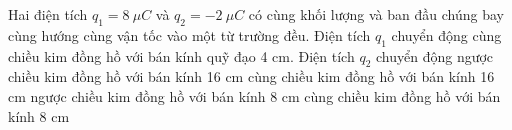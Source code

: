 \begin{vidu} %
	Hai điện tích $q_1 = 8\ \mu C$ và $q_2 = -2\ \mu C$ có cùng khối lượng và ban đầu chúng bay cùng hướng cùng vận tốc vào một từ trường đều. Điện tích ${q_1}$ chuyển động cùng chiều kim đồng hồ với bán kính quỹ đạo 4 cm. Điện tích ${q_2}$ chuyển động
	\choice
	{\True ngược chiều kim đồng hồ với bán kính 16 cm}
	{cùng chiều kim đồng hồ với bán kính 16 cm}
	{ngược chiều kim đồng hồ với bán kính 8 cm}
	{cùng chiều kim đồng hồ với bán kính 8 cm}
\end{vidu}
